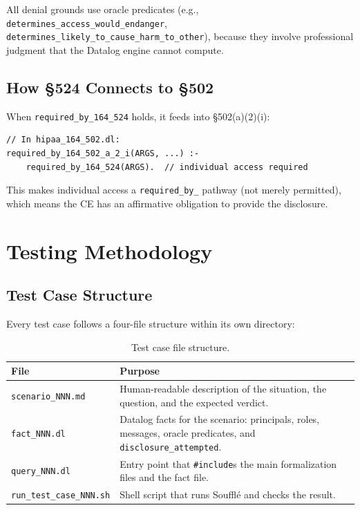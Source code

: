 \documentclass[11pt,letterpaper]{article}
\begin{document}
All denial grounds use oracle predicates (e.g., \texttt{determines\_access\_would\_endanger}, \texttt{determines\_likely\_to\_cause\_harm\_to\_other}), because they involve professional judgment that the Datalog engine cannot compute.

\subsection{How \S 524 Connects to \S 502}

When \texttt{required\_by\_164\_524} holds, it feeds into \S 502(a)(2)(i):

\begin{lstlisting}[style=soufflestyle,caption={How \S 524 feeds into the main permission framework}]
// In hipaa_164_502.dl:
required_by_164_502_a_2_i(ARGS, ...) :-
    required_by_164_524(ARGS).  // individual access required
\end{lstlisting}

This makes individual access a \texttt{required\_by\_} pathway (not merely permitted), which means the CE has an affirmative obligation to provide the disclosure.


\section{Testing Methodology}
\label{sec:testing}

\subsection{Test Case Structure}

Every test case follows a four-file structure within its own directory:

\begin{table}[H]
\centering
\begin{tabularx}{\textwidth}{lX}
\toprule
\textbf{File} & \textbf{Purpose} \\
\midrule
\texttt{scenario\_NNN.md}    & Human-readable description of the situation, the question, and the expected verdict. \\
\texttt{fact\_NNN.dl}        & Datalog facts for the scenario: principals, roles, messages, oracle predicates, and \texttt{disclosure\_attempted}. \\
\texttt{query\_NNN.dl}       & Entry point that \texttt{\#include}s the main formalization files and the fact file. \\
\texttt{run\_test\_case\_NNN.sh} & Shell script that runs Souffl\'{e} and checks the result. \\
\bottomrule
\end{tabularx}
\caption{Test case file structure.}
\end{table}
\end{document}
